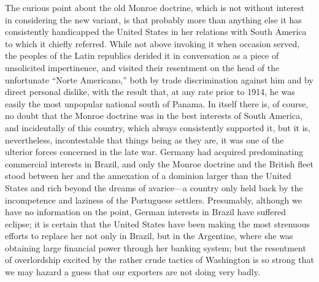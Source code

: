 \documentclass{book}
\begin{document}
The curious point about the old Monroe doctrine, which is not without interest in considering the new variant, is that probably more than anything else it has consistently handicapped the United States in her relations with South America to which it chiefly referred. While not above invoking it when occasion served, the peoples of the Latin republics derided it in conversation as a piece of unsolicited impertinence, and visited their resentment on the head of the unfortunate “Norte Americano,” both by trade discrimination against him and by direct personal dislike, with the result that, at any rate prior to 1914, he was easily the most unpopular national south of Panama. In itself there is, of course, no doubt that the Monroe doctrine was in the best interests of South America, and incidentally of this country, which always consistently supported it, but it is, nevertheless, incontestable that things being as they are, it was one of the ulterior forces concerned in the late war. Germany had acquired predominating commercial interests in Brazil, and only the Monroe doctrine and the British fleet stood between her and the annexation of a dominion larger than the United States and rich beyond the dreams of avarice—a country only held back by the incompetence and laziness of the Portuguese settlers. Presumably, although we have no information on the point, German interests in Brazil have suffered eclipse; it is certain that the United States have been making the most strenuous efforts to replace her not only in Brazil, but in the Argentine, where she was obtaining large financial power through her banking system; but the resentment of overlordship excited by the rather crude tactics of Washington is so strong that we may hazard a guess that our exporters are not doing very badly.
\end{document}
